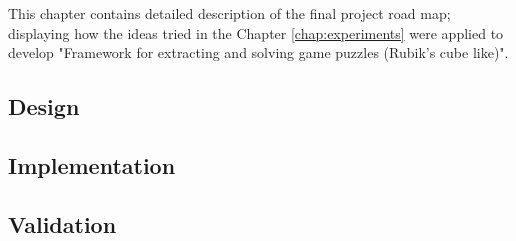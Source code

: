 \documentclass[../../main.tex]{subfiles}
\begin{document}
This chapter contains detailed description of the final project road map; displaying how the ideas tried in the Chapter \ref{chap:experiments} were applied to develop "Framework for extracting and solving game puzzles (Rubik's cube like)".

\subsection{Design}


\subsection{Implementation}


\subsection{Validation}

\end{document}
